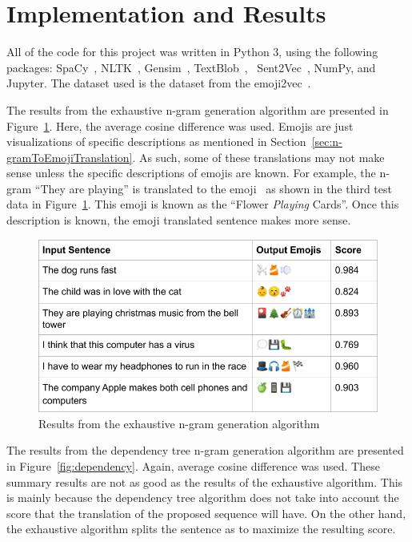 \documentclass{article}[10]
\newcommand*{\img}[1]{%
  \raisebox{-.3\baselineskip}{%
    \texttt{[image: \#1]}%
  }%
}
\begin{document}
\section{Implementation and Results\label{sec:implementationAndResults}}

All of the code for this project was written in Python 3, using the following packages: SpaCy~\cite{spacy2}, NLTK~\cite{bird2009natural}, Gensim~\cite{gensim}, TextBlob~\cite{TextBlob}, ~Sent2Vec~\cite{pg2017unsu}, NumPy\cite{numpy}, and Jupyter\cite{Kluyver:2016aa}. The dataset used is the dataset from the emoji2vec~\cite{Eisner_2016}.

The results from the exhaustive n-gram generation algorithm are presented in Figure~\ref{fig:extractive}. Here, the average cosine difference was used. Emojis are just visualizations of specific descriptions as mentioned in Section~\ref{sec:n-gramToEmojiTranslation}. As such, some of these translations may not make sense unless the specific descriptions of emojis are known. For example, the n-gram ``They are playing'' is translated to the emoji~\img{emojis/1f3b4.png} as shown in the third test data in Figure~\ref{fig:extractive}. This emoji is known as the ``Flower \emph{Playing} Cards''. Once this description is known, the emoji translated sentence makes more sense.

\begin{figure}[H]
  \begin{center}
    \includegraphics[width=\columnwidth]{figures/extractive.png}
    \caption{Results from the exhaustive n-gram generation algorithm\label{fig:extractive}}
  \end{center}
\end{figure}

The results from the dependency tree n-gram generation algorithm are presented in Figure~\ref{fig:dependency}. Again, average cosine difference was
used.  These summary results are not as good as the results of the exhaustive algorithm. This is mainly because the dependency tree algorithm does not take into account the score that the translation of the proposed sequence will have. On the other hand, the exhaustive algorithm splits the sentence as to maximize the resulting score.
\end{document}
